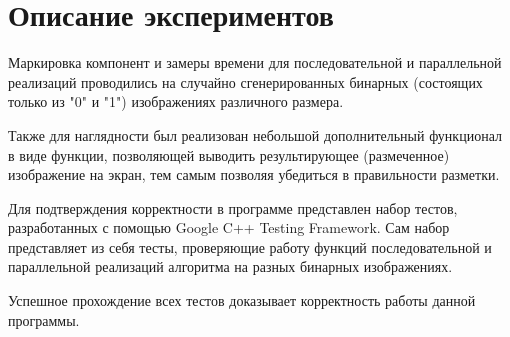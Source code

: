 \documentclass{report}
\begin{document}
	\section*{Описание экспериментов}
		\par Маркировка компонент и замеры времени для последовательной и параллельной реализаций проводились на случайно сгенерированных бинарных (состоящих только из "0" и "1"{}) изображениях различного размера.
		\par Также для наглядности был реализован небольшой дополнительный функционал в виде функции, позволяющей выводить результирующее (размеченное) изображение на экран, тем самым позволяя убедиться в правильности разметки.
		\par Для подтверждения корректности в программе представлен набор тестов, разработанных с помощью Google C++ Testing Framework. Сам набор представляет из себя тесты, проверяющие работу функций последовательной и параллельной реализаций алгоритма на разных бинарных изображениях.
		\par Успешное прохождение всех тестов доказывает корректность работы данной программы.
	\newpage


\end{document}

